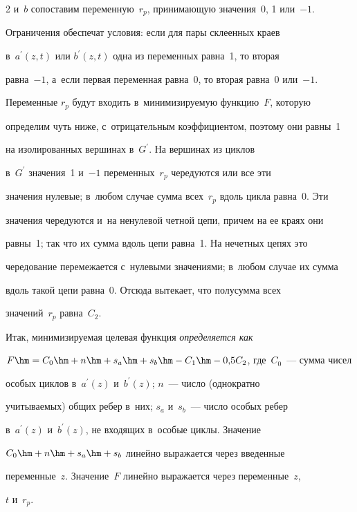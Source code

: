 \begin{multicols}{2}
и~$b$ сопоставим переменную~$r_p$, принимающую значения~0, 1 или~$-1$. 


Ограничения обеспечат условия: если для пары склеенных краев 


в~$a^\prime(z, t)$ или $b^\prime(z, t)$ одна из переменных рав\-на~1, то вторая 


равна~$-1$, а~если первая переменная рав\-на~0, то вторая рав\-на~0 или~$-1$. 


  


  Переменные $r_p$ будут входить в~минимизиру\-емую функцию~$F$, которую 


определим чуть ниже, с~отрицательным коэффициентом, поэтому они равны~1 


на изолированных вершинах в~$G^\prime$. На вершинах из циклов 


в~$G^\prime$ значения~1 и~$-1$ переменных~$r_p$ чередуются или все эти 


значения нулевые; в~любом случае сумма всех~$r_p$ вдоль цикла равна~0. Эти 


значения чередуются и~на ненулевой четной цепи, причем на ее краях они 


равны~1; так что их сумма вдоль цепи равна~1. На нечетных цепях это 


чередование перемежается с~нулевыми значениями; в~любом случае их сумма 


вдоль такой цепи равна~0. Отсюда вытекает, что полусумма всех 


значений~$r_p$ равна~$C_2$.


  


  Итак, минимизируемая целевая функция \textit{определяется как} 


$F\hm=C_0\hm+n\hm+s_a\hm+s_b\hm- C_1\hm- 0{,}5C_2$, где~$C_0$~--- сумма чисел 


особых циклов в~$a^\prime(z)$ и~$b^\prime(z)$; $n$~--- число (однократно 


учитываемых) общих ребер в~них; $s_a$ и~$s_b$~--- число особых ребер 


в~$a^\prime(z)$ и~$b^\prime(z)$, не входящих в~особые циклы. Значение 


$C_0\hm+n\hm+s_a\hm+s_b$ линейно выражается через введенные 


переменные~$z$. Значение~$F$ линейно выражается через переменные~$z$, 


$t$ и~$r_p$.


  



\end{multicols}

